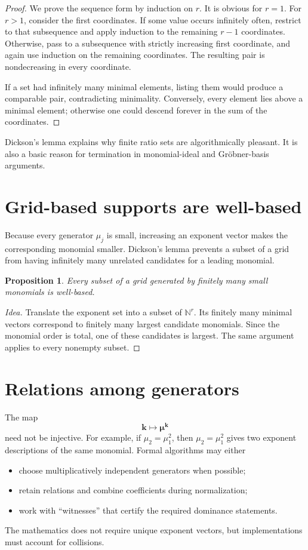 \documentclass[11pt,oneside]{book}
\newtheorem{proposition}[theorem]{Proposition}
\theoremstyle{definition}
\theoremstyle{remark}
\newcommand{\N}{\mathbb{N}}
\begin{document}
\begin{proof}
We prove the sequence form by induction on $r$. It is obvious for $r=1$. For
$r>1$, consider the first coordinates. If some value occurs infinitely often,
restrict to that subsequence and apply induction to the remaining $r-1$
coordinates. Otherwise, pass to a subsequence with strictly increasing first
coordinate, and again use induction on the remaining coordinates. The resulting
pair is nondecreasing in every coordinate.

If a set had infinitely many minimal elements, listing them would produce a
comparable pair, contradicting minimality. Conversely, every element lies above
a minimal element; otherwise one could descend forever in the sum of the
coordinates.
\end{proof}

Dickson's lemma explains why finite ratio sets are algorithmically pleasant. It
is also a basic reason for termination in monomial-ideal and Gr\"obner-basis
arguments.

\section{Grid-based supports are well-based}

Because every generator $\mu_j$ is small, increasing an exponent vector makes
the corresponding monomial smaller. Dickson's lemma prevents a subset of a grid
from having infinitely many unrelated candidates for a leading monomial.

\begin{proposition}
Every subset of a grid generated by finitely many small monomials is well-based.
\end{proposition}

\begin{proof}[Idea]
Translate the exponent set into a subset of $\N^r$. Its finitely many minimal
vectors correspond to finitely many largest candidate monomials. Since the
monomial order is total, one of these candidates is largest. The same argument
applies to every nonempty subset.
\end{proof}

\section{Relations among generators}

The map
\[
  \bm k\longmapsto\boldsymbol\mu^{\bm k}
\]
need not be injective. For example, if $\mu_2=\mu_1^2$, then
$\mu_2=\mu_1^2$ gives two exponent descriptions of the same monomial. Formal
algorithms may either
\begin{itemize}
\item choose multiplicatively independent generators when possible;
\item retain relations and combine coefficients during normalization;
\item work with ``witnesses'' that certify the required dominance statements.
\end{itemize}
The mathematics does not require unique exponent vectors, but implementations
must account for collisions.
\end{document}
